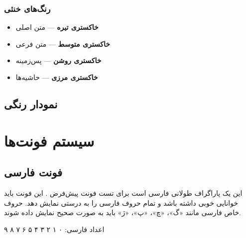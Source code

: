 \documentclass{matinbook}
\begin{document}
\subsection{رنگ‌های خنثی}

\begin{itemize}
    \item \textcolor{matindarkgray}{\textbf{خاکستری تیره}} --- متن اصلی
    \item \textcolor{matinmediumgray}{\textbf{خاکستری متوسط}} --- متن فرعی
    \item \colorbox{matinlightgray}{\textbf{خاکستری روشن}} --- پس‌زمینه
    \item \colorbox{matinbordergray}{\textbf{خاکستری مرزی}} --- حاشیه‌ها
\end{itemize}

\section{نمودار رنگی}

\begin{center}
\begin{latin}
\end{latin}
\end{center}

\chapter{سیستم فونت‌ها}

\section{فونت فارسی}

این یک پاراگراف طولانی فارسی است برای تست فونت پیش‌فرض .
این فونت باید خوانایی خوبی داشته باشد و تمام حروف فارسی را
به درستی نمایش دهد. حروف خاص فارسی مانند «گ»، «چ»، «پ»، «ژ»
باید به صورت صحیح نمایش داده شوند.

اعداد فارسی: ۰ ۱ ۲ ۳ ۴ ۵ ۶ ۷ ۸ ۹
\end{document}
